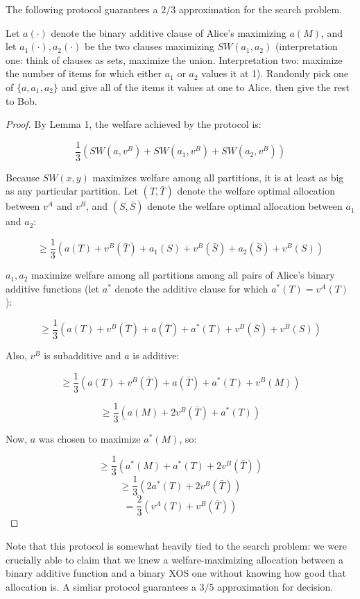 \begin{proposition} The following protocol guarantees a $2/3$ approximation for the search problem.
\end{proposition}

Let $a(\cdot)$ denote the binary additive clause of Alice's maximizing $a(M)$, and let $a_1(\cdot), a_2(\cdot)$ be the two clauses maximizing $SW(a_1,a_2)$ (interpretation one: think of clauses as sets, maximize the union. Interpretation two: maximize the number of items for which either $a_1$ or $a_2$ values it at 1). Randomly pick one of $\{a, a_1, a_2\}$ and give all of the items it values at one to Alice, then give the rest to Bob. \\

\begin{proof}
By Lemma 1, the welfare achieved by the protocol is:

$$\frac{1}{3}\left(SW(a, v^B) + SW(a_1,v^B)+ SW(a_2, v^B)\right)$$

Because $SW(x, y)$ maximizes welfare among all partitions, it is at least as big as any particular partition. Let $(T,\bar{T})$ denote the welfare optimal allocation between $v^A$ and $v^B$, and $(S,\bar{S})$ denote the welfare optimal allocation between $a_1$ and $a_2$:

$$\geq \frac{1}{3} \left(a(T) + v^B(\bar{T}) +  a_1(S) + v^B(\bar{S}) + a_2(\bar{S}) + v^B(S)\right)$$

$a_1, a_2$ maximize welfare among all partitions among all pairs of Alice's binary additive functions (let $a^*$ denote the additive clause for which $a^*(T) = v^A(T)$):

 $$\geq \frac{1}{3} \left(a(T) + v^B(\bar{T}) +  a(\bar{T}) + a^*(T) + v^B(\bar{S}) + v^B(S)\right)$$
 
 Also, $v^B$ is subadditive and $a$ is additive:

$$\geq \frac{1}{3} \left(a(T) + v^B(\bar{T}) +  a(\bar{T}) + a^*(T) + v^B(M)\right)$$

$$\geq \frac{1}{3} \left(a(M) + 2v^B(\bar{T}) + a^*(T)\right)$$

Now, $a$ was chosen to maximize $a^*(M)$, so:

$$\geq \frac{1}{3} \left(a^*(M) +a^*(T) +2v^B(\bar{T})\right)$$
$$\geq \frac{1}{3} \left(2a^*(T) + 2v^B(\bar{T})\right)$$
$$= \frac{2}{3} \left(v^A(T) + v^B(\bar{T})\right)$$
\end{proof}

Note that this protocol is somewhat heavily tied to the search problem: we were crucially able to claim that we knew a welfare-maximizing allocation between a binary additive function and a binary XOS one without knowing how good that allocation is. A simliar protocol guarantees a $3/5$ approximation for decision.


